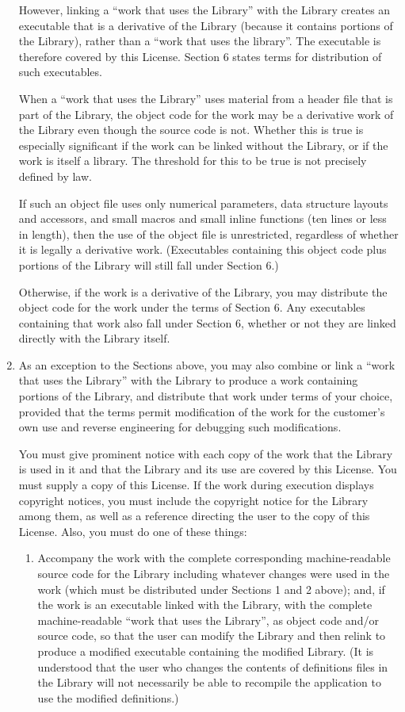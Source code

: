 \begin{enumerate}
  However, linking a ``work that uses the Library'' with the Library
creates an executable that is a derivative of the Library (because it
contains portions of the Library), rather than a ``work that uses the
library''.  The executable is therefore covered by this License.
Section 6 states terms for distribution of such executables.

  When a ``work that uses the Library'' uses material from a header file
that is part of the Library, the object code for the work may be a
derivative work of the Library even though the source code is not.
Whether this is true is especially significant if the work can be
linked without the Library, or if the work is itself a library.  The
threshold for this to be true is not precisely defined by law.

  If such an object file uses only numerical parameters, data
structure layouts and accessors, and small macros and small inline
functions (ten lines or less in length), then the use of the object
file is unrestricted, regardless of whether it is legally a derivative
work.  (Executables containing this object code plus portions of the
Library will still fall under Section 6.)

  Otherwise, if the work is a derivative of the Library, you may
distribute the object code for the work under the terms of Section 6.
Any executables containing that work also fall under Section 6,
whether or not they are linked directly with the Library itself.

\item As an exception to the Sections above, you may also combine or
link a ``work that uses the Library'' with the Library to produce a
work containing portions of the Library, and distribute that work
under terms of your choice, provided that the terms permit
modification of the work for the customer's own use and reverse
engineering for debugging such modifications.

  You must give prominent notice with each copy of the work that the
Library is used in it and that the Library and its use are covered by
this License.  You must supply a copy of this License.  If the work
during execution displays copyright notices, you must include the
copyright notice for the Library among them, as well as a reference
directing the user to the copy of this License.  Also, you must do one
of these things:

    \begin{enumerate}
    \item Accompany the work with the complete corresponding
    machine-readable source code for the Library including whatever
    changes were used in the work (which must be distributed under
    Sections 1 and 2 above); and, if the work is an executable linked
    with the Library, with the complete machine-readable ``work that
    uses the Library'', as object code and/or source code, so that the
    user can modify the Library and then relink to produce a modified
    executable containing the modified Library.  (It is understood
    that the user who changes the contents of definitions files in the
    Library will not necessarily be able to recompile the application
    to use the modified definitions.)


\end{enumerate}
\end{enumerate}
